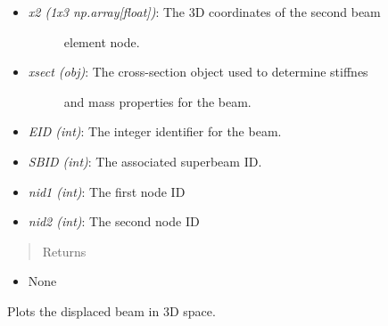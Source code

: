 \documentclass[letterpaper,10pt,english]{sphinxmanual}
\begin{document}
\begin{fulllineitems}
\begin{fulllineitems}
\begin{itemize}
\item {} \begin{description}
\item[{\emph{x2 (1x3 np.array{[}float{]})}: The 3D coordinates of the second beam}] \leavevmode
element node.

\end{description}

\item {} \begin{description}
\item[{\emph{xsect (obj)}: The cross-section object used to determine stiffnes}] \leavevmode
and mass properties for the beam.

\end{description}

\item {} 
\emph{EID (int)}: The integer identifier for the beam.

\item {} 
\emph{SBID (int)}: The associated superbeam ID.

\item {} 
\emph{nid1 (int)}: The first node ID

\item {} 
\emph{nid2 (int)}: The second node ID

\end{itemize}
\begin{quote}\begin{description}
\item[{Returns}] \leavevmode
\end{description}\end{quote}
\begin{itemize}
\item {} 
None

\end{itemize}

\end{fulllineitems}


\begin{fulllineitems}
\label{structures:AeroComBAT.Structures.TBeam.plotDisplBeam}
Plots the displaced beam in 3D space.


\end{fulllineitems}
\end{fulllineitems}
\end{document}
